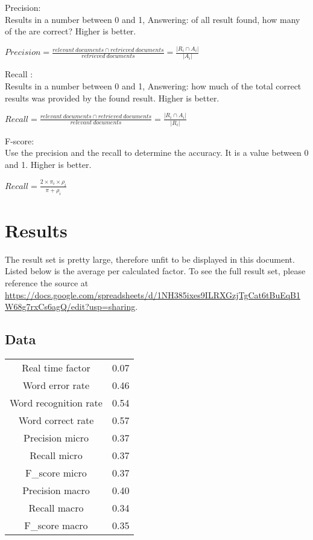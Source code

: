 \documentclass{article}
\begin{document}
    Precision: \\
    Results in a number between 0 and 1, Answering: of all result found, how many of the are correct? Higher is better.
    \begin{center}
    $ Precision = \frac{relevant\ documents \cap retrieved\ documents}{retrieved\ documents} = \frac{|R_i \cap A_i|}{|A_i|} $ \\
    \end{center} 
    
    Recall : \\
    Results in a number between 0 and 1, Answering: how much of the total correct results was provided by the found result. Higher is better.
    \begin{center}
    $ Recall = \frac{relevant\ documents \cap retrieved\ documents}{relevant\ documents} = \frac{|R_i \cap A_i|}{|R_i|} $ \\
    \end{center} 
    
    F-score: \\
    Use the precision and the recall to determine the accuracy. It is a value between 0 and 1. Higher is better.
    \begin{center}
    $ Recall = \frac{2 \times \pi_i \times \rho_i}{\pi + \rho_i} $\\
    \end{center} 


\section{Results}
The result set is pretty large, therefore unfit to be displayed in this document. Listed below is the average per calculated factor. To see the full result set, please reference the source at \url{https://docs.google.com/spreadsheets/d/1NH385ixes9ILRXGzjTgCat6tBuEqB1W68g7rxCs6agQ/edit?usp=sharing}.
\subsection{Data}

\begin{center}
\begin{tabular}{ |c|c| } 
 \hline
 Real time factor & 0.07 \\ 
 Word error rate & 0.46 \\ 
 Word recognition rate & 0.54 \\ 
 Word correct rate & 0.57 \\ 
 Precision micro & 0.37 \\ 
 Recall micro & 0.37 \\ 
 F\_score micro & 0.37 \\  
 Precision macro & 0.40 \\  
 Recall macro & 0.34 \\  
 F\_score macro & 0.35 \\   
 \hline
\end{tabular}
\end{center}
\end{document}
